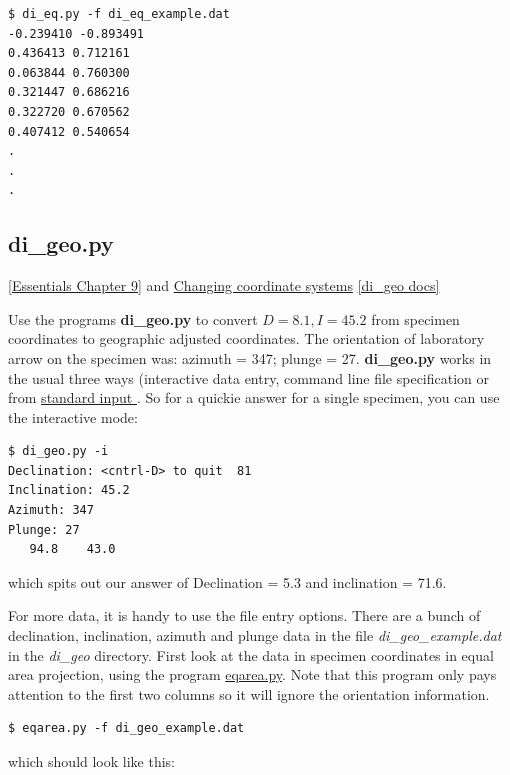 \documentclass[11pt]{book}
\begin{document}
{{\begin{verbatim}
$ di_eq.py -f di_eq_example.dat
-0.239410 -0.893491
0.436413 0.712161
0.063844 0.760300
0.321447 0.686216
0.322720 0.670562
0.407412 0.540654
.
.
.
\end{verbatim}

\subsection{di\_geo.py}
\href{http://earthref.org/MAGIC/books/Tauxe/Essentials/WebBook3ch9.html#ch9}{[Essentials Chapter 9]} and
\href{http://earthref.org/MAGIC/books/Tauxe/Essentials/WebBook3ap1.html#Changing_coordinate_systems}{Changing coordinate systems}
\href{https://github.com/PmagPy/PmagPy/blob/master/programs/di_geo.py}{[di\_geo docs]}

Use the programs {\bf di\_geo.py}  to convert
$D=8.1, I=45.2$ from specimen coordinates  to geographic  adjusted coordinates. The
orientation of laboratory arrow on the specimen was: azimuth = 347;
plunge = 27.
{\bf di\_geo.py} works in the usual three ways (interactive data entry, command line file specification or from  \href{#standard_IO}{standard input }.  So for a quickie answer for a single specimen, you can use the interactive mode:

\begin{verbatim}
$ di_geo.py -i
Declination: <cntrl-D> to quit  81
Inclination: 45.2
Azimuth: 347
Plunge: 27
   94.8    43.0
\end{verbatim}
\noindent which spits out our answer of Declination = 5.3 and inclination = 71.6.

For more data, it is handy to use the file entry options. There are a bunch of declination, inclination, azimuth and plunge data in the file {\it di\_geo\_example.dat} in the {\it di\_geo} directory.  First look at the data in specimen coordinates in equal area projection, using the program \href{#eqarea.py}{eqarea.py}.  Note that this program only pays attention to the first two columns so it will ignore the orientation information.

\begin{verbatim}
$ eqarea.py -f di_geo_example.dat
\end{verbatim}
which should look like this:

}}
\end{document}
